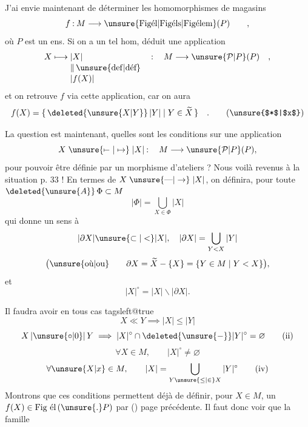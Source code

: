 
J'ai envie maintenant de déterminer les homomorphismes de magasins
\[
 f\mathbin{:}M\longrightarrow\unsure{\text{Figél}|\text{Figéls}|\text{Figélem}}(P)\qquad ,
\]
où $P$ est un ens. Si on a un tel hom,   déduit une application
\[
 \begin{aligned}
 X\longmapsto{} & |X| &&\mathbin{:}\quad M\longrightarrow\unsure{\mathcal P|P}(P)\quad ,\\[-2pt]
 & \Vert\,\unsure{\mathrm{def}|\text{déf}}\\[-2pt]
 & |f(X)|
 \end{aligned}
\]
et on retrouve $f$ via cette application, car on aura
\[
 f(X)=\{\,\deleted{\unsure{X|Y}}\,|Y|\mid Y\in\widetilde X\,\}\quad . \tag*{(\unsure{$*$|$x$})}
\]
\endgroup

La question est maintenant, quelles sont les conditions sur une application 
\[
 X\mathrel{\unsure{\mapstochar\relbar|\mapsto}}|X|\mathbin{:}\quad M\longrightarrow\unsure{\mathcal P|P}(P),
\]
pour  pouvoir être définie par un morphisme d'ateliers ? Nous voilà revenus à la situation p. 33 ! En termes de $X\mathrel{\unsure{\text{---}|\to}}|X|$, on définira, pour  toute   $\deleted{\unsure{A}}\,\Phi\subset M$
\[
 |\Phi|=\bigcup_{X\in\Phi}|X|
\]
 qui donne un sens à
\[
 |\partial X|\unsure{\subset|<}|X|,\quad |\partial X|=\bigcup_{Y<X}|Y|
\]
\[
 \bigl(\text{\unsure{où|ou}}\qquad\partial X=\widetilde X-\{X\}=\{Y\in M\mid Y<X\}\bigr),
\]
et 
\[
 |X|^\circ=|X|\mathbin{\backslash}|\partial X|.
\]

 Il faudra avoir en tous cas
\begingroup\csname tagsleft@true\endcsname
\[
 X\ll Y\implies |X|\leq |Y| \tag*{(i)}
\]
\[
 X\,|\unsure{\circ|0}|\,Y\implies |X|^\circ\cap\deleted{\unsure{-}}|Y|^\circ=\varnothing \tag*{(ii)}
\]
\[
 \forall X\in M,\qquad |X|^\circ\ne\varnothing \tag*{(iii)}
\]
\[
 \forall \unsure{X|x}\in M,\qquad |X|=\bigcup_{Y\unsure{\leq|\in} X}|Y|^\circ \tag*{(iv)}
\]
\endgroup
Montrons que ces conditions permettent déjà de définir, pour  $X\in M$, un $f(X)\in\text{Fig él}\,(\unsure{.}P)$ par () page précédente. Il faut donc voir que la famille

